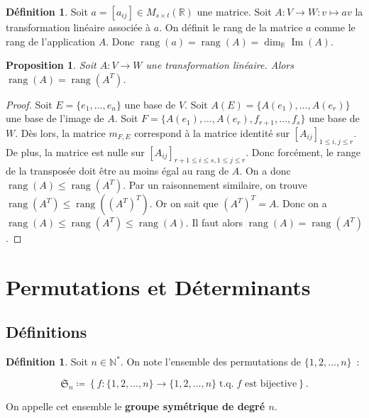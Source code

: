 \documentclass{article}
\DeclareMathOperator{\tq}{\text{ t.q. }}
\DeclareMathOperator{\Imf}{Im}
\DeclareMathOperator{\rang}{rang}
\newcommand{\R}{\mathbb R}
\newcommand{\M}[3]{M_{#1 \times #2}(#3)}
\newtheorem{prp}[thm]{Proposition}
\theoremstyle{definition}
\newtheorem{déf}[thm]{Définition}
\theoremstyle{remark}
\begin{document}
		\begin{déf} Soit $a = [a_{ij}] \in \M st\R$ une matrice. Soit $A : V \to W : v \mapsto av$ la transformation linéaire associée à $a$. On définit le rang de
		la matrice $a$ comme le rang de l'application $A$. Donc $\rang(a) = \rang(A) = \dim_\R\Imf(A)$. \end{déf}

		\begin{prp} Soit $A : V \to W$ une transformation linéaire. Alors $\rang(A) = \rang(A^T)$. \end{prp}

		\begin{proof} Soit $E = \{e_1, \dotsc, e_n\}$ une base de $V$. Soit $A(E) = \{A(e_1), \dotsc, A(e_r)\}$ une base de l'image de $A$. Soit
		$F = \{A(e_1), \dotsc, A(e_r), f_{r+1}, \dotsc, f_s\}$ une base de $W$. Dès lors, la matrice $m_{F, E}$ correspond à la matrice identité sur
		$[A_{ij}]_{1 \leq i, j \leq r}$. De plus, la matrice est nulle sur $[A_{ij}]_{r+1 \leq i \leq s, 1 \leq j \leq r}$. Donc forcément, le range de la transposée
		doit être au moins égal au rang de $A$. On a donc $\rang(A) \leq \rang(A^T)$. Par un raisonnement similaire, on trouve
		$\rang(A^T) \leq \rang\left(\left(A^T\right)^T\right)$. Or on sait que $\left(A^T\right)^T = A$. Donc on a $\rang(A) \leq \rang(A^T) \leq \rang(A)$. Il faut
		alors $\rang(A) = \rang(A^T)$. \end{proof}

\newpage
\section{Permutations et Déterminants}
	\subsection{Définitions}
		\begin{déf} Soit $n \in \mathbb N^*$. On note l'ensemble des permutations de $\{1, 2, \dotsc, n\}$~:
		
		\[\mathfrak{S}_n \coloneqq \left\{f : \{1, 2, \dotsc, n\} \to \{1, 2, \dotsc, n\} \tq f \text{ est bijective}\right\}.\]
		
		On appelle cet ensemble le \textbf{groupe symétrique de degré $n$}. \end{déf}
\end{document}
